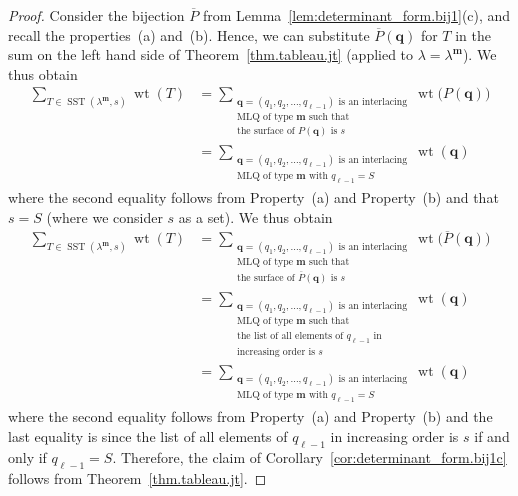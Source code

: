 \documentclass[reqno]{amsart}
\newcommand{\0}{\phantom{c}}
\DeclareMathOperator{\wt}{wt} %
\DeclareMathOperator{\SST}{SST} %
\newcommand{\mm}{\mathbf{m}}
\newcommand{\qq}{\mathbf{q}}
\let\sumnonlimits\sum
\renewcommand{\sum}{\sumnonlimits\limits}
\newenvironment{verlong}{}{}
\newenvironment{vershort}{}{}
\newcommand{\tup}[1]{\left( #1 \right)}
\theoremstyle{plain}
\theoremstyle{definition}
\numberwithin{equation}{section}
\begin{document}
\begin{proof}
Consider the bijection $\overline{P}$ from Lemma~\ref{lem:determinant_form.bij1}(c), and recall the properties~(a) and~(b).
Hence, we can substitute $\overline{P}(\qq)$ for $T$ in the sum on the left hand side of Theorem~\ref{thm.tableau.jt} (applied to $\lambda = \lambda^{\mm}$).
\begin{vershort}
We thus obtain
\begin{align*}
\sum_{T \in \SST(\lambda^{\mm}, s)} \wt(T)
  & = \sum_{\substack{\qq=\tup{q_1, q_2, \dotsc, q_{\ell-1}} \text{ is an interlacing}\\\text{MLQ of type } \mm \text{ such that} \\\text{the surface of }P(\qq) \text{ is } s}} \wt\bigl(  P(\qq) \bigr) \\
&  = \sum_{\substack{\qq = \tup{q_1,q_2,\dotsc,q_{\ell-1}} \text{ is an interlacing}\\\text{MLQ of type } \mm \text{ with } q_{\ell-1} = S}} \wt(\qq)
\end{align*}
where the second equality follows from Property~(a) and Property~(b) and that $s = S$ (where we consider $s$ as a set).
\end{vershort}
\begin{verlong}
We thus obtain
\begin{align*}
\sum_{T \in \SST(\lambda^{\mm}, s)} \wt(T)
  & = \sum_{\substack{\qq=\tup{q_1, q_2, \dotsc, q_{\ell-1}} \text{ is an interlacing}\\\text{MLQ of type } \mm \text{ such that} \\\text{the surface of } \overline{P}(\qq) \text{ is } s}} \wt\bigl(  \overline{P}(\qq) \bigr) \\
&  = \sum_{\substack{\qq= \tup{q_1, q_2, \dotsc,q_{\ell-1}} \text{ is an interlacing}\\\text{MLQ of type } \mm \text{ such that}\\\text{the list of all elements of } q_{\ell-1} \text{ in} \\\text{increasing order is } s}} \wt(\qq) \\
&  = \sum_{\substack{\qq = \tup{q_1,q_2,\dotsc,q_{\ell-1}} \text{ is an interlacing}\\\text{MLQ of type } \mm \text{ with } q_{\ell-1} = S}} \wt(\qq)
\end{align*}
where the second equality follows from Property~(a) and Property~(b) and the last equality is since the list of all elements of $q_{\ell-1}$ in increasing order is $s$ if and only if $q_{\ell-1}=S$.
\end{verlong}
Therefore, the claim of Corollary~\ref{cor:determinant_form.bij1c} follows from Theorem~\ref{thm.tableau.jt}.
\end{proof}
\end{document}

